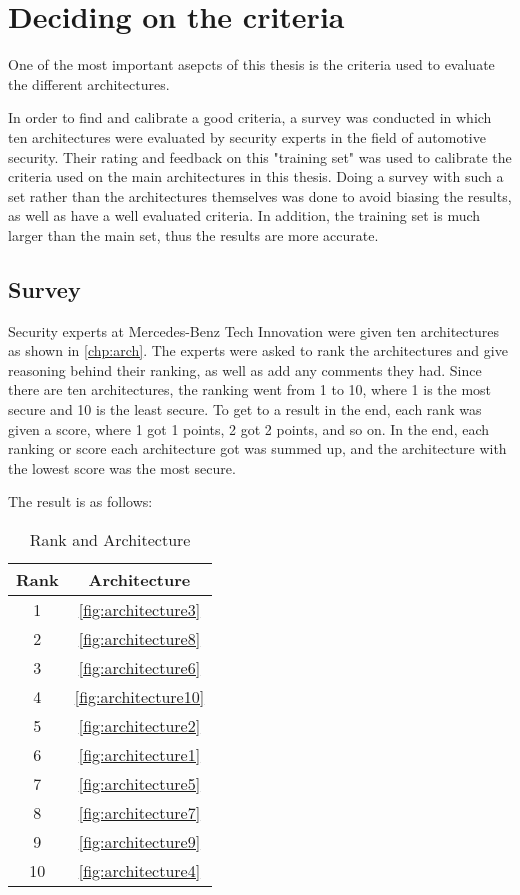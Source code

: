 \chapter{Deciding on the criteria}
\label{chp:criteria}

One of the most important asepcts of this thesis is the criteria used to evaluate the different architectures.

In order to find and calibrate a good criteria, a survey was conducted in which ten architectures were evaluated by security experts in the field of automotive security.
Their rating and feedback on this "training set" was used to calibrate the criteria used on the main architectures in this thesis.
Doing a survey with such a set rather than the architectures themselves was done to avoid biasing the results, as well as have a well evaluated criteria.
In addition, the training set is much larger than the main set, thus the results are more accurate.

\section{Survey}
\label{sec:survey}

Security experts at Mercedes-Benz Tech Innovation were given ten architectures as shown in \ref{chp:arch}.
The experts were asked to rank the architectures and give reasoning behind their ranking, as well as add any comments they had.
Since there are ten architectures, the ranking went from 1 to 10, where 1 is the most secure and 10 is the least secure.
To get to a result in the end, each rank was given a score, where 1 got 1 points, 2 got 2 points, and so on.
In the end, each ranking or score each architecture got was summed up, and the architecture with the lowest score was the most secure.

The result is as follows:

\begin{table}[h]
    \label{table:survey}
    \centering
    \caption{Rank and Architecture}
    \begin{tabular}{ |c|c| } 
    \hline
    Rank & Architecture \\
    \hline
    1 & \ref{fig:architecture3}\\
    2 & \ref{fig:architecture8}\\
    3 & \ref{fig:architecture6}\\
    4 & \ref{fig:architecture10}\\
    5 & \ref{fig:architecture2}\\
    6 & \ref{fig:architecture1}\\
    7 & \ref{fig:architecture5}\\
    8 & \ref{fig:architecture7}\\
    9 & \ref{fig:architecture9}\\
    10 & \ref{fig:architecture4}\\
    \hline
    \end{tabular}
\end{table}

